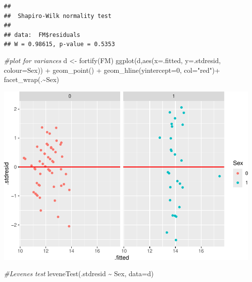 \documentclass[
]{article}
\newenvironment{Shaded}{\begin{snugshade}}{\end{snugshade}}
\newcommand{\AttributeTok}[1]{\textcolor[rgb]{0.77,0.63,0.00}{#1}}
\newcommand{\CommentTok}[1]{\textcolor[rgb]{0.56,0.35,0.01}{\textit{#1}}}
\newcommand{\DecValTok}[1]{\textcolor[rgb]{0.00,0.00,0.81}{#1}}
\newcommand{\FunctionTok}[1]{\textcolor[rgb]{0.00,0.00,0.00}{#1}}
\newcommand{\NormalTok}[1]{#1}
\newcommand{\OtherTok}[1]{\textcolor[rgb]{0.56,0.35,0.01}{#1}}
\newcommand{\SpecialCharTok}[1]{\textcolor[rgb]{0.00,0.00,0.00}{#1}}
\newcommand{\StringTok}[1]{\textcolor[rgb]{0.31,0.60,0.02}{#1}}
\begin{document}
\begin{Shaded}
\end{Shaded}

\begin{verbatim}
## 
##  Shapiro-Wilk normality test
## 
## data:  FM$residuals
## W = 0.98615, p-value = 0.5353
\end{verbatim}

\begin{Shaded}
\begin{Highlighting}[]
\CommentTok{\#plot for variances}
\NormalTok{d }\OtherTok{\textless{}{-}} \FunctionTok{fortify}\NormalTok{(FM)}
\FunctionTok{ggplot}\NormalTok{(d,}\FunctionTok{aes}\NormalTok{(}\AttributeTok{x=}\NormalTok{.fitted, }\AttributeTok{y=}\NormalTok{.stdresid, }\AttributeTok{colour=}\NormalTok{Sex)) }\SpecialCharTok{+} 
  \FunctionTok{geom\_point}\NormalTok{() }\SpecialCharTok{+} 
  \FunctionTok{geom\_hline}\NormalTok{(}\AttributeTok{yintercept=}\DecValTok{0}\NormalTok{, }\AttributeTok{col=}\StringTok{"red"}\NormalTok{)}\SpecialCharTok{+}
  \FunctionTok{facet\_wrap}\NormalTok{(.}\SpecialCharTok{\textasciitilde{}}\NormalTok{Sex)}
\end{Highlighting}
\end{Shaded}

\includegraphics{WorkingExample3_code_files/figure-latex/unnamed-chunk-9-1.pdf}

\begin{Shaded}
\begin{Highlighting}[]
\CommentTok{\#Levene\textquotesingle{}s test}
\FunctionTok{leveneTest}\NormalTok{(.stdresid }\SpecialCharTok{\textasciitilde{}}\NormalTok{ Sex, }\AttributeTok{data=}\NormalTok{d)}
\end{Highlighting}
\end{Shaded}
\end{document}
